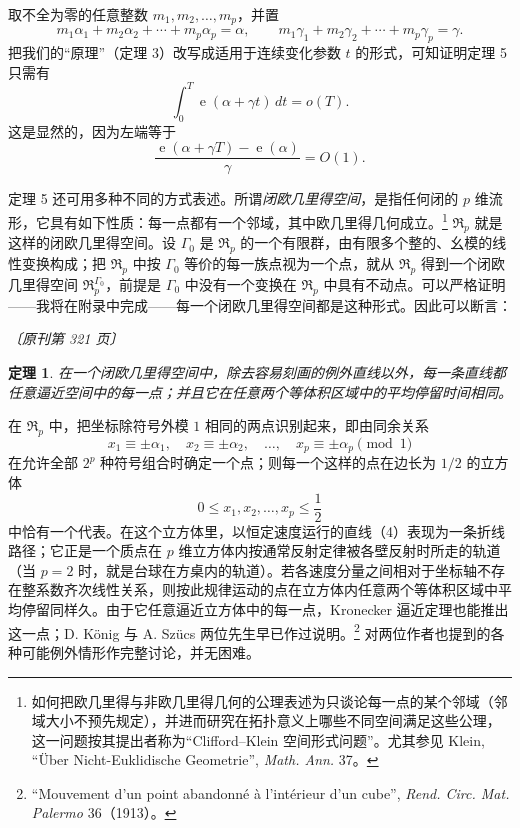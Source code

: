 \documentclass[UTF8,11pt,a4paper,fontset=none]{ctexart}
\theoremstyle{weylthm}
\newtheorem{theorem}{定理}
\newcommand{\e}{\operatorname{e}}
\newcommand{\origpage}[1]{%
  \par\vspace{0.7em}\noindent\hfill{\small\itshape〔原刊第 #1 页〕}\par\vspace{0.25em}}
\begin{document}
取不全为零的任意整数 \(m_1,m_2,\ldots,m_p\)，并置
\[
  m_1\alpha_1+m_2\alpha_2+\cdots+m_p\alpha_p=\alpha,
  \qquad
  m_1\gamma_1+m_2\gamma_2+\cdots+m_p\gamma_p=\gamma.
\]
把我们的“原理”（定理 3）改写成适用于连续变化参数 \(t\) 的形式，可知证明定理 5 只需有
\[
  \int_0^T\e(\alpha+\gamma t)\,dt=o(T).
\]
这是显然的，因为左端等于
\[
  \frac{\e(\alpha+\gamma T)-\e(\alpha)}{\gamma}=O(1).
\]

定理 5 还可用多种不同的方式表述。所谓\emph{闭欧几里得空间}，是指任何闭的 \(p\) 维流形，它具有如下性质：每一点都有一个邻域，其中欧几里得几何成立。\footnote{如何把欧几里得与非欧几里得几何的公理表述为只谈论每一点的某个邻域（邻域大小不预先规定），并进而研究在拓扑意义上哪些不同空间满足这些公理，这一问题按其提出者称为“Clifford--Klein 空间形式问题”。尤其参见 Klein, “Über Nicht-Euklidische Geometrie”, \textit{Math. Ann.} 37。} \(\mathfrak R_p\) 就是这样的闭欧几里得空间。设 \(\Gamma_0\) 是 \(\mathfrak R_p\) 的一个有限群，由有限多个整的、幺模的线性变换构成；把 \(\mathfrak R_p\) 中按 \(\Gamma_0\) 等价的每一族点视为一个点，就从 \(\mathfrak R_p\) 得到一个闭欧几里得空间 \(\mathfrak R_p^{\Gamma_0}\)，前提是 \(\Gamma_0\) 中没有一个变换在 \(\mathfrak R_p\) 中具有不动点。可以严格证明——我将在附录中完成——每一个闭欧几里得空间都是这种形式。因此可以断言：

\origpage{321}

\begin{theorem}
在一个闭欧几里得空间中，除去容易刻画的例外直线以外，每一条直线都任意逼近空间中的每一点；并且它在任意两个等体积区域中的平均停留时间相同。
\end{theorem}

在 \(\mathfrak R_p\) 中，把坐标除符号外模 \(1\) 相同的两点识别起来，即由同余关系
\[
  x_1\equiv\pm\alpha_1,
  \quad x_2\equiv\pm\alpha_2,
  \quad\ldots,\quad
  x_p\equiv\pm\alpha_p\pmod1
\]
在允许全部 \(2^p\) 种符号组合时确定一个点；则每一个这样的点在边长为 \(1/2\) 的立方体
\[
  0\leq x_1,x_2,\ldots,x_p\leq\frac12
\]
中恰有一个代表。在这个立方体里，以恒定速度运行的直线（4）表现为一条折线路径；它正是一个质点在 \(p\) 维立方体内按通常反射定律被各壁反射时所走的轨道（当 \(p=2\) 时，就是台球在方桌内的轨道）。若各速度分量之间相对于坐标轴不存在整系数齐次线性关系，则按此规律运动的点在立方体内任意两个等体积区域中平均停留同样久。由于它任意逼近立方体中的每一点，Kronecker 逼近定理也能推出这一点；D. König 与 A. Szücs 两位先生早已作过说明。\footnote{“Mouvement d'un point abandonné à l'intérieur d'un cube”, \textit{Rend. Circ. Mat. Palermo} 36（1913）。} 对两位作者也提到的各种可能例外情形作完整讨论，并无困难。
\end{document}
